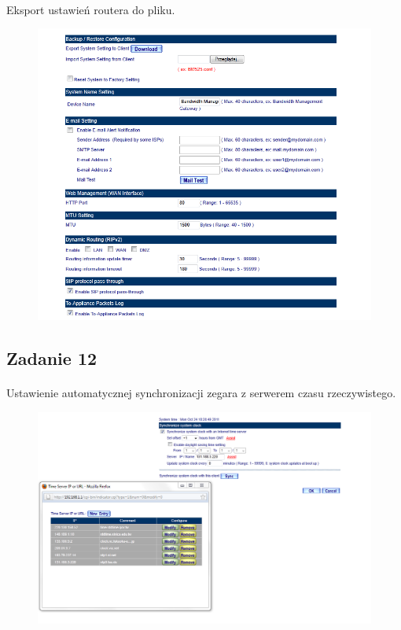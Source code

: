 \documentclass[wide,a4paper,titlepage,12pt] {article}
\begin{document}
  \paragraph{}
  Eksport ustawień routera do pliku.
  \begin{figure}[h!]
    \begin{center}
      \includegraphics[width=\textwidth]{12.PNG}
    \end{center}
  \end{figure}

  \newpage
  \subsection{Zadanie 12}
  \paragraph{}
  Ustawienie automatycznej synchronizacji zegara z serwerem czasu rzeczywistego.
  \begin{figure}[h!]
    \begin{center}
      \includegraphics[width=\textwidth]{14.PNG}
    \end{center}
  \end{figure}
\end{document}

